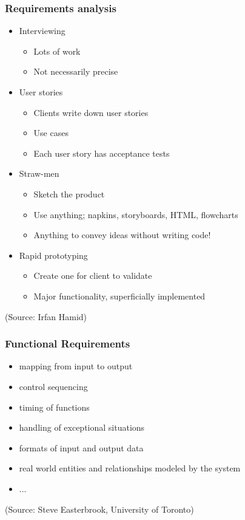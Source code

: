 \documentclass[10pt]{beamer}
\begin{document}
\begin{frame}[fragile]
  \frametitle{Requirements analysis}
  \begin{itemize}
  \item Interviewing
    \begin{itemize}
    \item Lots of work
    \item Not necessarily precise
    \end{itemize}
  \item User stories
    \begin{itemize}
    \item Clients write down user stories
    \item Use cases
    \item Each user story has acceptance tests
    \end{itemize}
  \item Straw-men
    \begin{itemize}
    \item Sketch the product
    \item Use anything; napkins, storyboards, HTML, flowcharts
    \item Anything to convey ideas without writing code!
    \end{itemize}
  \item Rapid prototyping
    \begin{itemize}
    \item Create one for client to validate
    \item Major functionality, superficially implemented
    \end{itemize}
  \end{itemize}
\tiny (Source: Irfan Hamid)
\end{frame}

\begin{frame}[fragile]
  \frametitle{Functional Requirements}
  \begin{itemize}
  \item mapping from input to output
  \item control sequencing
  \item timing of functions
  \item handling of exceptional situations
  \item formats of input and output data
  \item real world entities and relationships modeled by the system
  \item ...
  \end{itemize}
\tiny (Source: Steve Easterbrook, University of Toronto)
\end{frame}
\end{document}
